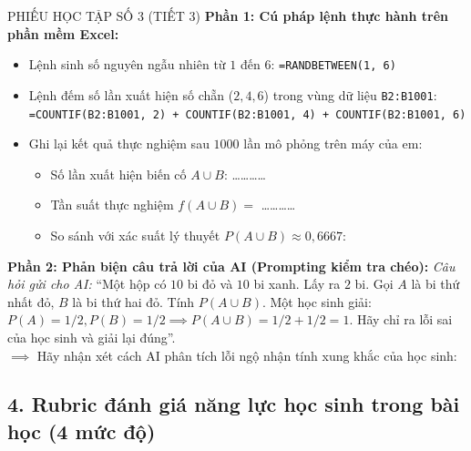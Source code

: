 \documentclass[12pt, a4paper]{article}
\begin{document}
\begin{pedabox}{PHIẾU HỌC TẬP SỐ 3 (TIẾT 3)}
\textbf{Phần 1: Cú pháp lệnh thực hành trên phần mềm Excel:}
\begin{itemize}[leftmargin=0.5cm]
    \item Lệnh sinh số nguyên ngẫu nhiên từ $1$ đến $6$: \texttt{=RANDBETWEEN(1, 6)}
    \item Lệnh đếm số lần xuất hiện số chẵn ($2, 4, 6$) trong vùng dữ liệu \texttt{B2:B1001}:\\
    \texttt{=COUNTIF(B2:B1001, 2) + COUNTIF(B2:B1001, 4) + COUNTIF(B2:B1001, 6)}
    \item Ghi lại kết quả thực nghiệm sau $1000$ lần mô phỏng trên máy của em:
    \begin{itemize}
        \item Số lần xuất hiện biến cố $A \cup B$: \dots\dots\dots\dots
        \item Tần suất thực nghiệm $f(A \cup B) = $ \dots\dots\dots\dots
        \item So sánh với xác suất lý thuyết $P(A \cup B) \approx 0{,}6667$: \dotfill
    \end{itemize}
\end{itemize}

\textbf{Phần 2: Phản biện câu trả lời của AI (Prompting kiểm tra chéo):}
\textit{Câu hỏi gửi cho AI:} ``Một hộp có $10$ bi đỏ và $10$ bi xanh. Lấy ra $2$ bi. Gọi $A$ là bi thứ nhất đỏ, $B$ là bi thứ hai đỏ. Tính $P(A \cup B)$. Một học sinh giải: $P(A) = 1/2, P(B) = 1/2 \implies P(A \cup B) = 1/2 + 1/2 = 1$. Hãy chỉ ra lỗi sai của học sinh và giải lại đúng''.\\
$\implies$ Hãy nhận xét cách AI phân tích lỗi ngộ nhận tính xung khắc của học sinh: \dotfill
\end{pedabox}

\subsection*{4. Rubric đánh giá năng lực học sinh trong bài học (4 mức độ)}
\end{document}
